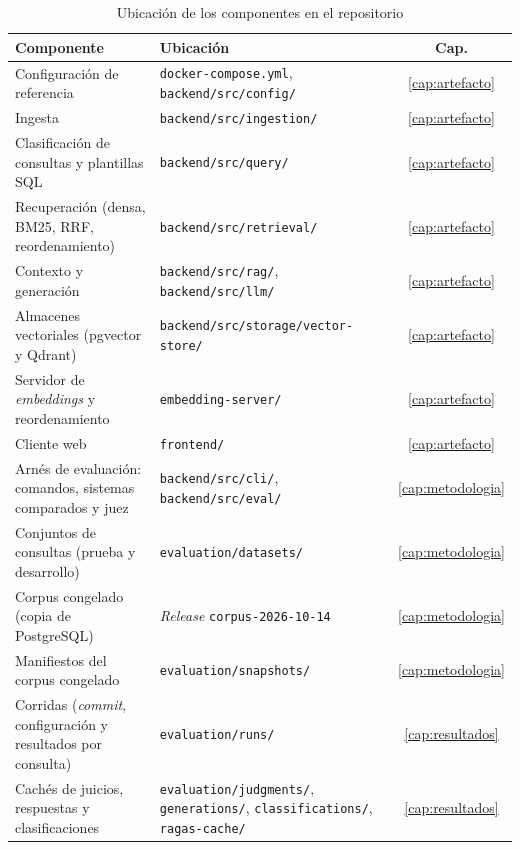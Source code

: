 \begin{table}[!htb]
    \centering
    \caption{Ubicación de los componentes en el repositorio}
    \label{tab:anx-repositorio}
    \small
    \begin{tabular}{|p{5cm}|p{7.6cm}|c|}
        \hline
        \textbf{Componente} & \textbf{Ubicación} & \textbf{Cap.} \\
        \hline
        Configuración de referencia & \texttt{docker-compose.yml}, \texttt{backend/src/config/} & \ref{cap:artefacto} \\
        \hline
        Ingesta & \texttt{backend/src/ingestion/} & \ref{cap:artefacto} \\
        \hline
        Clasificación de consultas y plantillas SQL & \texttt{backend/src/query/} & \ref{cap:artefacto} \\
        \hline
        Recuperación (densa, BM25, RRF, reordenamiento) & \texttt{backend/src/retrieval/} & \ref{cap:artefacto} \\
        \hline
        Contexto y generación & \texttt{backend/src/rag/}, \texttt{backend/src/llm/} & \ref{cap:artefacto} \\
        \hline
        Almacenes vectoriales (pgvector y Qdrant) & \texttt{backend/src/storage/vector-store/} & \ref{cap:artefacto} \\
        \hline
        Servidor de \textit{embeddings} y reordenamiento & \texttt{embedding-server/} & \ref{cap:artefacto} \\
        \hline
        Cliente web & \texttt{frontend/} & \ref{cap:artefacto} \\
        \hline
        Arnés de evaluación: comandos, sistemas comparados y juez & \texttt{backend/src/cli/}, \texttt{backend/src/eval/} & \ref{cap:metodologia} \\
        \hline
        Conjuntos de consultas (prueba y desarrollo) & \texttt{evaluation/datasets/} & \ref{cap:metodologia} \\
        \hline
        Corpus congelado (copia de PostgreSQL) & \textit{Release} \texttt{corpus-2026-10-14} & \ref{cap:metodologia} \\
        \hline
        Manifiestos del corpus congelado & \texttt{evaluation/snapshots/} & \ref{cap:metodologia} \\
        \hline
        Corridas (\textit{commit}, configuración y resultados por consulta) & \texttt{evaluation/runs/} & \ref{cap:resultados} \\
        \hline
        Cachés de juicios, respuestas y clasificaciones & \texttt{evaluation/judgments/}, \texttt{generations/}, \texttt{classifications/}, \texttt{ragas-cache/} & \ref{cap:resultados} \\

\end{tabular}
\end{table}
